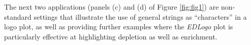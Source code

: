 \documentclass{bmcart}
\begin{document}



The next two applications (panels (c) and (d) of Figure \ref{fig:fig1}) are non-standard settings
that illustrate the use of general strings as ``characters'' in a logo plot, as well as
providing further examples where the \textit{EDLogo} plot is particularly effective at highlighting depletion as well as enrichment.
\end{document}
